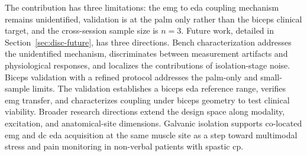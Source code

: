 The contribution has three limitations: the \gls{emg} to \gls{eda} coupling mechanism remains unidentified, validation is at the palm only rather than the biceps clinical target, and the cross-session sample size is $n = \num{3}$. Future work, detailed in Section~\ref{sec:disc-future}, has three directions. Bench characterization addresses the unidentified mechanism, discriminates between measurement artifacts and physiological responses, and localizes the contributions of isolation-stage noise. Biceps validation with a refined protocol addresses the palm-only and small-sample limits. The validation establishes a biceps \gls{eda} reference range, verifies \gls{emg} transfer, and characterizes coupling under biceps geometry to test clinical viability. Broader research directions extend the design space along modality, excitation, and anatomical-site dimensions. Galvanic isolation supports co-located \gls{emg} and \gls{dc} \gls{eda} acquisition at the same muscle site as a step toward multimodal stress and pain monitoring in non-verbal patients with spastic \gls{cp}.

